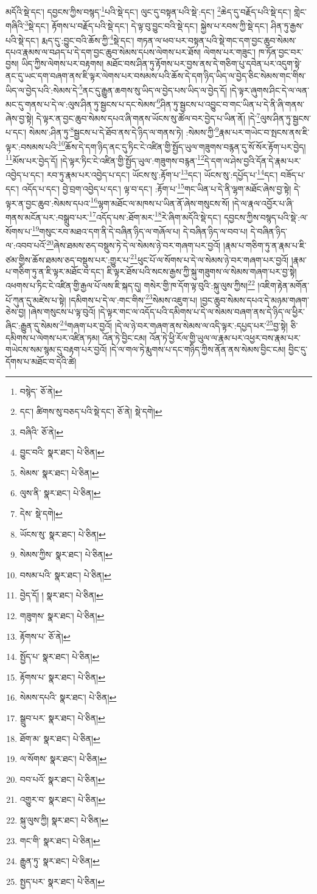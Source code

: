 མདོའི་སྡེ་དང་། དབྱངས་ཀྱིས་བསྙད་\footnote{བསྙེད་  ཅོ་ནེ། }པའི་སྡེ་དང་། ལུང་དུ་བསྟན་པའི་སྡེ་:དང་།  \footnote{དང་། ཚིགས་སུ་བཅད་པའི་སྡེ་དང་།   ཅོ་ནེ།  སྡེ་དགེ། }ཆེད་དུ་བརྗོད་པའི་སྡེ་དང་། གླེང་གཞིའི་\footnote{བཞིའི་  ཅོ་ནེ། }སྡེ་དང་། རྟོགས་པ་བརྗོད་པའི་སྡེ་དང་། དེ་ལྟ་བུ་བྱུང་བའི་སྡེ་དང་། སྐྱེས་པ་རབས་ཀྱི་སྡེ་དང་། ཤིན་ཏུ་རྒྱས་པའི་སྡེ་དང་། རྨད་དུ་:བྱུང་བའི་ཆོས་ཀྱི་\footnote{བྱུང་བའི་  སྣར་ཐང་།  པེ་ཅིན། }སྡེ་དང་། གཏན་ལ་ཕབ་པར་བསྟན་པའི་སྡེ་གང་དག་བྱང་ཆུབ་སེམས་དཔའ་རྣམས་ལ་བཤད་པ་དེ་དག་བྱང་ཆུབ་སེམས་དཔས་ལེགས་པར་ཐོས། ལེགས་པར་གཟུང་། ཁ་ཏོན་བྱང་བར་བྱས། ཡིད་ཀྱིས་ལེགས་པར་བརྟགས། མཐོང་བས་ཤིན་ཏུ་རྟོགས་པར་བྱས་ནས་དེ་གཅིག་པུ་དབེན་པར་འདུག་སྟེ་ནང་དུ་ཡང་དག་བཞག་ནས་ཇི་ལྟར་ལེགས་པར་བསམས་པའི་ཆོས་དེ་དག་ཉིད་ཡིད་ལ་བྱེད་ཅིང་སེམས་གང་གིས་ཡིད་ལ་བྱེད་པའི་:སེམས་དེ་\footnote{སེམས་  སྣར་ཐང་།  པེ་ཅིན། }ནང་དུ་རྒྱུན་ཆགས་སུ་ཡིད་ལ་བྱེད་པས་ཡིད་ལ་བྱེད་དོ། །དེ་ལྟར་ཞུགས་ཤིང་དེ་ལ་ལན་མང་དུ་གནས་པ་དེ་ལ་:ལུས་ཤིན་ཏུ་སྦྱངས་པ་དང་སེམས་\footnote{ལུས་ནི་  སྣར་ཐང་།  པེ་ཅིན། }ཤིན་ཏུ་སྦྱངས་པ་འབྱུང་བ་གང་ཡིན་པ་དེ་ནི་ཞི་གནས་ཞེས་བྱ་སྟེ། དེ་ལྟར་ན་བྱང་ཆུབ་སེམས་དཔའ་ཞི་གནས་ཡོངས་སུ་ཚོལ་བར་བྱེད་པ་ཡིན་ནོ། །དེ་\footnote{དེས་  སྡེ་དགེ། }ལུས་ཤིན་ཏུ་སྦྱངས་པ་དང་། སེམས་:ཤིན་ཏུ་\footnote{ཡོངས་སུ་  སྣར་ཐང་།  པེ་ཅིན། }སྦྱངས་པ་དེ་ཐོབ་ནས་དེ་ཉིད་ལ་གནས་ཏེ། :སེམས་ཀྱི་\footnote{སེམས་ཀྱིས་  སྣར་ཐང་།  པེ་ཅིན། }རྣམ་པར་གཡེང་བ་སྤངས་ནས་ཇི་ལྟར་:བསམས་པའི་\footnote{བསམ་པའི་  སྣར་ཐང་།  པེ་ཅིན། }ཆོས་དེ་དག་ཉིད་ནང་དུ་ཏིང་ངེ་འཛིན་གྱི་སྤྱོད་ཡུལ་གཟུགས་བརྙན་དུ་སོ་སོར་རྟོག་པར་བྱེད། \footnote{བྱེད་དོ། །   སྣར་ཐང་།  པེ་ཅིན། }མོས་པར་བྱེད་དོ། །དེ་ལྟར་ཏིང་ངེ་འཛིན་གྱི་སྤྱོད་ཡུལ་:གཟུགས་བརྙན་\footnote{གཟུགས་  སྣར་ཐང་།  པེ་ཅིན། }དེ་དག་ལ་ཤེས་བྱའི་དོན་དེ་རྣམ་པར་འབྱེད་པ་དང་། རབ་ཏུ་རྣམ་པར་འབྱེད་པ་དང་། ཡོངས་སུ་:རྟོག་པ་\footnote{རྟོགས་པ་  ཅོ་ནེ། }དང་། ཡོངས་སུ་:དཔྱོད་པ་\footnote{སྤྱོད་པ་  སྣར་ཐང་།  པེ་ཅིན། }དང་། བཟོད་པ་དང་། འདོད་པ་དང་། བྱེ་བྲག་འབྱེད་པ་དང་། ལྟ་བ་དང་། :རྟོག་པ་\footnote{རྟོགས་པ་  སྣར་ཐང་།  པེ་ཅིན། }གང་ཡིན་པ་དེ་ནི་ལྷག་མཐོང་ཞེས་བྱ་སྟེ། དེ་ལྟར་ན་བྱང་ཆུབ་:སེམས་དཔའ་\footnote{སེམས་དཔའི་  སྣར་ཐང་།  པེ་ཅིན། }ལྷག་མཐོང་ལ་མཁས་པ་ཡིན་ནོ་ཞེས་གསུངས་སོ། །དེ་ལ་རྣལ་འབྱོར་པ་ཞི་གནས་མངོན་པར་:བསྒྲུབ་པར་\footnote{སྒྲུབ་པར་  སྣར་ཐང་།  པེ་ཅིན། }འདོད་པས་:ཐོག་མར་\footnote{ཐོག་མ་  སྣར་ཐང་།  པེ་ཅིན། }རེ་ཞིག་མདོའི་སྡེ་དང་། དབྱངས་ཀྱིས་བསྙད་པའི་སྡེ་:ལ་སོགས་པ་\footnote{ལ་སོགས་  སྣར་ཐང་།  པེ་ཅིན། }གསུང་རབ་མཐའ་དག་ནི་དེ་བཞིན་ཉིད་ལ་གཞོལ་པ། དེ་བཞིན་ཉིད་ལ་བབ་པ། དེ་བཞིན་ཉིད་ལ་:འབབ་པའོ་\footnote{བབ་པའོ་  སྣར་ཐང་།  པེ་ཅིན། }ཞེས་ཐམས་ཅད་བསྡུས་ཏེ་དེ་ལ་སེམས་ཉེ་བར་གཞག་པར་བྱའོ། །རྣམ་པ་གཅིག་ཏུ་ན་རྣམ་པ་ཇི་ཙམ་གྱིས་ཆོས་ཐམས་ཅད་བསྡུས་པར་:གྱུར་པ་\footnote{འགྱུར་བ་  སྣར་ཐང་།  པེ་ཅིན། }ཕུང་པོ་ལ་སོགས་པ་དེ་ལ་སེམས་ཉེ་བར་གཞག་པར་བྱའོ། །རྣམ་པ་གཅིག་ཏུ་ན་ཇི་ལྟར་མཐོང་བ་དང་། ཇི་ལྟར་ཐོས་པའི་སངས་རྒྱས་ཀྱི་སྐུ་གཟུགས་ལ་སེམས་གཞག་པར་བྱ་སྟེ། འཕགས་པ་ཏིང་ངེ་འཛིན་གྱི་རྒྱལ་པོ་ལས་ཇི་སྐད་དུ། གསེར་གྱི་ཁ་དོག་ལྟ་བུའི་:སྐུ་ལུས་ཀྱིས།\footnote{སྐུ་ལུས་ཀྱི།  སྣར་ཐང་།  པེ་ཅིན། } །འཇིག་རྟེན་མགོན་པོ་ཀུན་དུ་མཛེས་པ་སྟེ། །དམིགས་པ་དེ་ལ་:གང་གིས་\footnote{གང་གི་  སྣར་ཐང་།  པེ་ཅིན། }སེམས་འཇུག་པ། །བྱང་ཆུབ་སེམས་དཔའ་དེ་མཉམ་གཞག་ཅེས་བྱ། །ཞེས་གསུངས་པ་ལྟ་བུའོ། །དེ་ལྟར་གང་ལ་འདོད་པའི་དམིགས་པ་དེ་ལ་སེམས་བཞག་ནས་དེ་ཉིད་ལ་ཕྱིར་ཞིང་:རྒྱུན་དུ་སེམས་\footnote{རྒྱུན་ཏུ་  སྣར་ཐང་།  པེ་ཅིན། }གཞག་པར་བྱའོ། །དེ་ལ་ཉེ་བར་གཞག་ནས་སེམས་ལ་འདི་ལྟར་:དཔྱད་པར་\footnote{སྤྱད་པར་  སྣར་ཐང་།  པེ་ཅིན། }བྱ་སྟེ། ཅི་དམིགས་པ་ལེགས་པར་འཛིན་ཏམ། འོན་ཏེ་བྱིང་ངམ། འོན་ཏེ་ཕྱི་རོལ་གྱི་ཡུལ་ལ་རྣམ་པར་འཕྱར་བས་རྣམ་པར་གཡེངས་སམ་སྙམ་དུ་བརྟག་པར་བྱའོ། །དེ་ལ་གལ་ཏེ་རྨུགས་པ་དང་གཉིད་ཀྱིས་ནོན་ནས་སེམས་བྱིང་ངམ། བྱིང་དུ་དོགས་པ་མཐོང་བ་དེའི་ཚེ། 